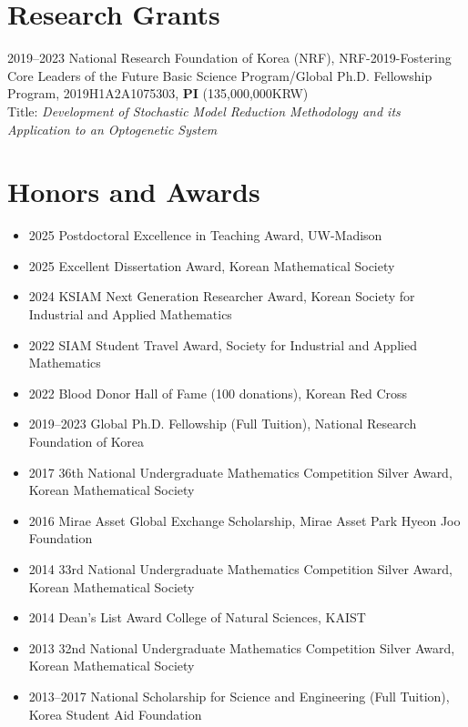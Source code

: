 \documentclass[margin,line]{res}
\newcommand{\vspacesection}{\vspace*{-1.5mm}}
\begin{document}
\begin{resume}
\section{\sc Research Grants}
2019–2023 National Research Foundation of Korea (NRF), NRF-2019-Fostering Core Leaders of the Future Basic Science Program/Global Ph.D. Fellowship Program, 2019H1A2A1075303, \textbf{PI} (135,000,000KRW)\\
Title: \textit{Development of Stochastic Model Reduction Methodology and its Application to an Optogenetic System}

\vspacesection
\section{\sc Honors and Awards}
\begin{itemize}[leftmargin=-1pt, label={}]
    \item 2025 Postdoctoral Excellence in Teaching Award, UW-Madison
    \item 2025 Excellent Dissertation Award, Korean Mathematical Society
    \item 2024 KSIAM Next Generation Researcher Award, Korean Society for Industrial and Applied Mathematics
    \item 2022 SIAM Student Travel Award, Society for Industrial and Applied Mathematics
    \item 2022 Blood Donor Hall of Fame (100 donations), Korean Red Cross
    \item 2019–2023 Global Ph.D. Fellowship (Full Tuition), National Research Foundation of Korea
    \item 2017 36th National Undergraduate Mathematics Competition Silver Award, Korean Mathematical Society
    \item 2016 Mirae Asset Global Exchange Scholarship, Mirae Asset Park Hyeon Joo Foundation
    \item 2014 33rd National Undergraduate Mathematics Competition Silver Award, Korean Mathematical Society
    \item 2014 Dean's List Award College of Natural Sciences, KAIST
    \item 2013 32nd National Undergraduate Mathematics Competition Silver Award, Korean Mathematical Society
    \item 2013–2017 National Scholarship for Science and Engineering (Full Tuition), Korea Student Aid Foundation
\end{itemize}
\vspacesection

\end{resume}
\end{document}

